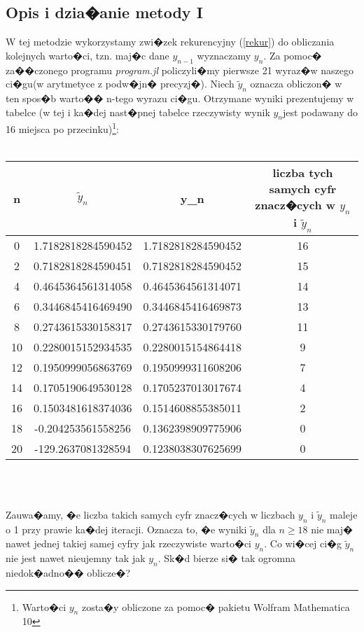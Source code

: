 \documentclass[12pt,wide]{mwart}
\begin{document}
\subsection{Opis i dzia�anie metody I}
W tej metodzie wykorzystamy zwi�zek rekurencyjny (\ref{rekur}) do obliczania kolejnych warto�ci, tzn. maj�c dane $y_{n-1}$ wyznaczamy $y_n$. Za pomoc� za��czonego programu \textit{program.jl} policzyli�my pierwsze 21 wyraz�w naszego ci�gu(w arytmetyce z podw�jn� precyzj�). Niech $\tilde{y}_n$ oznacza obliczon� w ten spos�b warto�� n-tego wyrazu ci�gu. Otrzymane wyniki prezentujemy w tabelce (w tej i ka�dej nast�pnej tabelce rzeczywisty wynik $y_n$jest podawany do 16 miejsca po przecinku)\footnote{Warto�ci $y_n$ zosta�y obliczone za pomoc� pakietu Wolfram Mathematica 10}:\\\\
\begin{flushleft}
\small{
\begin{tabular}{||c|c|c|c||} \hline
n &  $\tilde{y}_n$ & y_n & liczba tych samych cyfr znacz�cych w $y_n$ i $\tilde{y}_n$ \\ \hline
0      &  1.7182818284590452 &  1.7182818284590452 & 16\\
\hline
2      &  0.7182818284590451 &  0.7182818284590452 & 15\\
\hline
4      &  0.4645364561314058 &  0.4645364561314071 & 14\\
\hline
6      &  0.3446845416469490 &  0.3446845416469873 & 13\\
\hline
8      &  0.2743615330158317 &  0.2743615330179760 & 11\\
\hline
10     &  0.2280015152934535 &  0.2280015154864418 & 9 \\
\hline
12     &  0.1950999056863769 &  0.1950999311608206 & 7\\
\hline
14     &  0.1705190649530128 &  0.1705237013017674 & 4\\
\hline
16     &  0.1503481618374036 &  0.1514608855385011 & 2\\
\hline 
18     &  -0.204253561558256 &  0.1362398909775906 & 0\\
\hline
20     &  -129.2637081328594 &  0.1238038307625699 & 0\\
\hline  
\end{tabular}}\\\\
\end{flushleft}
Zauwa�amy, �e liczba takich samych cyfr znacz�cych w liczbach $y_n$ i $\tilde{y}_n$ maleje o 1 przy prawie ka�dej iteracji. Oznacza to, �e wyniki $\tilde{y}_n$ dla $n\geq 18$ nie maj� nawet jednej takiej samej cyfry jak rzeczywiste warto�ci $y_n$. Co wi�cej ci�g $\tilde{y}_n$ nie jest nawet nieujemny tak jak $y_n$. Sk�d bierze si� tak ogromna niedok�adno�� oblicze�?
\end{document}
